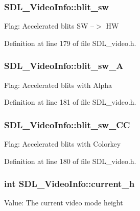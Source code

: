 \subsubsection[{blit\+\_\+sw}]{ S\+D\+L\+\_\+\+Video\+Info\+::blit\+\_\+sw}\label{struct_s_d_l___video_info_aa7dc499b5b1bea4bdb4de04bd58fc796}
Flag\+: Accelerated blits S\+W --$>$ H\+W 

Definition at line 179 of file S\+D\+L\+\_\+video.\+h.

\hypertarget{struct_s_d_l___video_info_ad8319697999a5d00f551e2b7547f17aa}{}
\subsubsection[{blit\+\_\+sw\+\_\+\+A}]{ S\+D\+L\+\_\+\+Video\+Info\+::blit\+\_\+sw\+\_\+\+A}\label{struct_s_d_l___video_info_ad8319697999a5d00f551e2b7547f17aa}
Flag\+: Accelerated blits with Alpha 

Definition at line 181 of file S\+D\+L\+\_\+video.\+h.

\hypertarget{struct_s_d_l___video_info_aafaf9067d0b70d78ec9d58c32895b62e}{}
\subsubsection[{blit\+\_\+sw\+\_\+\+C\+C}]{ S\+D\+L\+\_\+\+Video\+Info\+::blit\+\_\+sw\+\_\+\+C\+C}\label{struct_s_d_l___video_info_aafaf9067d0b70d78ec9d58c32895b62e}
Flag\+: Accelerated blits with Colorkey 

Definition at line 180 of file S\+D\+L\+\_\+video.\+h.

\hypertarget{struct_s_d_l___video_info_ae797099dc83c35aa6fa9a157fee4c120}{}
\subsubsection[{current\+\_\+h}]{\setlength{\rightskip}{0pt plus 5cm}int S\+D\+L\+\_\+\+Video\+Info\+::current\+\_\+h}\label{struct_s_d_l___video_info_ae797099dc83c35aa6fa9a157fee4c120}
Value\+: The current video mode height 

